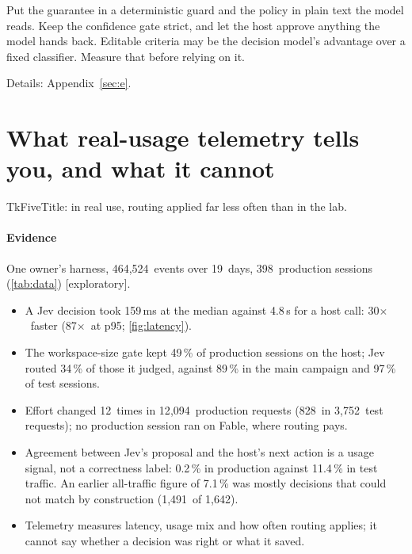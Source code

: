 \documentclass[11pt,letterpaper]{article}
\newcommand{\expl}{\mbox{\textsf{\small\color{okgray}[exploratory]}}}
\newcommand{\X}{\ensuremath{\times}}
\newcommand{\TkTitle}[1]{\csname Tk#1Title\endcsname}
\newcommand{\AoFableJevRoute}{89}
\newcommand{\ObAllN}{1{,}642}
\newcommand{\ObAllRate}{7.1}
\newcommand{\ObDays}{19}
\newcommand{\ObEffReqProd}{12{,}094}
\newcommand{\ObEffReqTest}{3{,}752}
\newcommand{\ObEffSwitchProd}{12}
\newcommand{\ObEffSwitchTest}{828}
\newcommand{\ObEvents}{464{,}524}
\newcommand{\ObHostPfifty}{4.8}
\newcommand{\ObJevHostXFifty}{30}
\newcommand{\ObJevHostXNinetyfive}{87}
\newcommand{\ObJevPfifty}{159}
\newcommand{\ObJevRouteProd}{34}
\newcommand{\ObJevRouteTest}{97}
\newcommand{\ObProdRate}{0.2}
\newcommand{\ObProdSessions}{398}
\newcommand{\ObStScopePct}{49}
\newcommand{\ObTestRate}{11.4}
\newcommand{\ObUnmatchN}{1{,}491}
\newcommand{\StSec}[1]{Appendix~\ref{#1}}
\begin{document}
\begin{keyidea}[title={For practitioners}]
Put the guarantee in a deterministic guard and the policy in plain text the model reads. Keep the confidence gate
strict, and let the host approve anything the model hands back. Editable criteria may be the decision
model's advantage over a fixed classifier. Measure that before relying on it.
\end{keyidea}

Details: \StSec{sec:e}.
\section{What real-usage telemetry tells you, and what it cannot}\label{sec:telemetry}

\begin{claimbox}
\TkTitle{Five}: in real use, routing applied far less often than in the lab.
\end{claimbox}

\paragraph{Evidence} One owner's harness, \ObEvents\ events over \ObDays\ days, \ObProdSessions\ production sessions
(\cref{tab:data}) \expl.
\begin{itemize}[leftmargin=1.2em]
  \item A Jev decision took \ObJevPfifty\,ms at the median against \ObHostPfifty\,s for a host call: \ObJevHostXFifty\X\
    faster (\ObJevHostXNinetyfive\X\ at p95; \cref{fig:latency}).
  \item The workspace-size gate kept \ObStScopePct\,\% of production sessions on the host; Jev routed \ObJevRouteProd\,\%
    of those it judged, against \AoFableJevRoute\,\% in the main campaign and \ObJevRouteTest\,\% of test sessions.
  \item Effort changed \ObEffSwitchProd\ times in \ObEffReqProd\ production requests (\ObEffSwitchTest\ in \ObEffReqTest\
    test requests); no production session ran on Fable, where routing pays.
  \item Agreement between Jev's proposal and the host's next action is a usage signal, not a correctness label:
    \ObProdRate\,\% in production against \ObTestRate\,\% in test traffic. An earlier all-traffic figure of \ObAllRate\,\%
    was mostly decisions that could not match by construction (\ObUnmatchN\ of \ObAllN).
  \item Telemetry measures latency, usage mix and how often routing applies; it cannot say whether a decision was right
    or what it saved.
\end{itemize}
\end{document}
